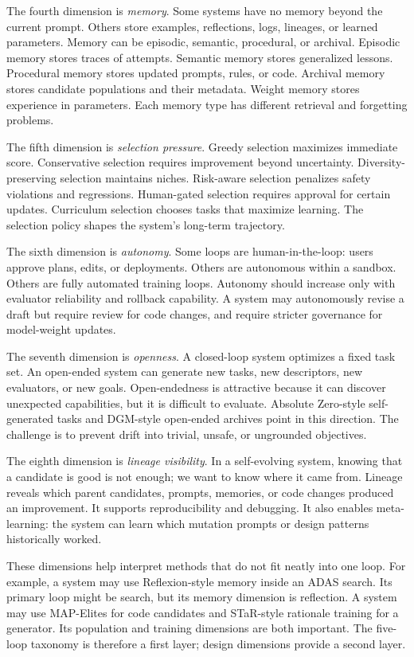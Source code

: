 The fourth dimension is \emph{memory}.  Some systems have no memory beyond the current prompt.  Others store examples, reflections, logs, lineages, or learned parameters.  Memory can be episodic, semantic, procedural, or archival.  Episodic memory stores traces of attempts.  Semantic memory stores generalized lessons.  Procedural memory stores updated prompts, rules, or code.  Archival memory stores candidate populations and their metadata.  Weight memory stores experience in parameters.  Each memory type has different retrieval and forgetting problems.

The fifth dimension is \emph{selection pressure}.  Greedy selection maximizes immediate score.  Conservative selection requires improvement beyond uncertainty.  Diversity-preserving selection maintains niches.  Risk-aware selection penalizes safety violations and regressions.  Human-gated selection requires approval for certain updates.  Curriculum selection chooses tasks that maximize learning.  The selection policy shapes the system's long-term trajectory.

The sixth dimension is \emph{autonomy}.  Some loops are human-in-the-loop: users approve plans, edits, or deployments.  Others are autonomous within a sandbox.  Others are fully automated training loops.  Autonomy should increase only with evaluator reliability and rollback capability.  A system may autonomously revise a draft but require review for code changes, and require stricter governance for model-weight updates.

The seventh dimension is \emph{openness}.  A closed-loop system optimizes a fixed task set.  An open-ended system can generate new tasks, new descriptors, new evaluators, or new goals.  Open-endedness is attractive because it can discover unexpected capabilities, but it is difficult to evaluate.  Absolute Zero-style self-generated tasks and DGM-style open-ended archives point in this direction.  The challenge is to prevent drift into trivial, unsafe, or ungrounded objectives.

The eighth dimension is \emph{lineage visibility}.  In a self-evolving system, knowing that a candidate is good is not enough; we want to know where it came from.  Lineage reveals which parent candidates, prompts, memories, or code changes produced an improvement.  It supports reproducibility and debugging.  It also enables meta-learning: the system can learn which mutation prompts or design patterns historically worked.

These dimensions help interpret methods that do not fit neatly into one loop.  For example, a system may use Reflexion-style memory inside an ADAS search.  Its primary loop might be search, but its memory dimension is reflection.  A system may use MAP-Elites for code candidates and STaR-style rationale training for a generator.  Its population and training dimensions are both important.  The five-loop taxonomy is therefore a first layer; design dimensions provide a second layer.

